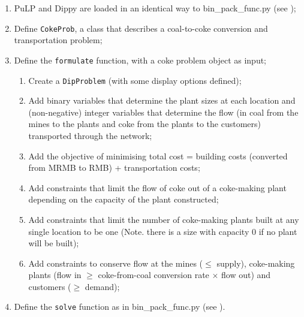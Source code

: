 \begin{enumerate}[leftmargin=0cm,itemindent=0.75cm,labelwidth=.5cm,labelsep=.25cm,labelindent=0cm,align=left]
\item PuLP and Dippy are loaded in an identical way to bin\_pack\_func.py (see );

\item Define \lstinline{CokeProb}, a class that describes a coal-to-coke conversion and transportation problem;


\item Define the \lstinline{formulate} function, with a coke problem object as input;
\begin{enumerate}[leftmargin=0cm,itemindent=0.75cm,labelwidth=.5cm,labelsep=.25cm,labelindent=0cm,align=left]
\item Create a \lstinline{DipProblem} (with some display options defined);


\item Add binary variables that determine the plant sizes at each location and (non-negative) integer variables that determine the flow (in coal from the mines to the plants and coke from the plants to the customers) transported through the network;


\item Add the objective of minimising total cost = building costs (converted from MRMB to RMB) + transportation costs;


\item Add constraints that limit the flow of coke out of a coke-making plant depending on the capacity of the plant constructed;


\item Add constraints that limit the number of coke-making plants built at any single location to be one (Note. there is a size with capacity 0 if no plant will be built);


\item Add constraints to conserve flow at the mines ($\leq$ supply), coke-making plants (flow in $\geq$ coke-from-coal conversion rate $\times$ flow out) and customers ($\geq$ demand);

\end{enumerate}

\item Define the \lstinline{solve} function as in bin\_pack\_func.py (see ).

\end{enumerate}

